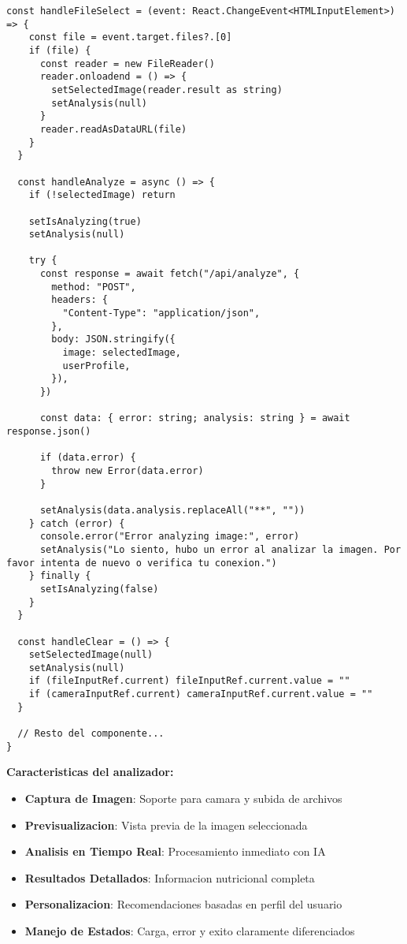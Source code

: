 \documentclass[12pt,a4paper]{article}
\begin{document}
\begin{lstlisting}[caption=components/meals/image-analyzer.tsx - Estructura principal]
  const handleFileSelect = (event: React.ChangeEvent<HTMLInputElement>) => {
    const file = event.target.files?.[0]
    if (file) {
      const reader = new FileReader()
      reader.onloadend = () => {
        setSelectedImage(reader.result as string)
        setAnalysis(null)
      }
      reader.readAsDataURL(file)
    }
  }

  const handleAnalyze = async () => {
    if (!selectedImage) return

    setIsAnalyzing(true)
    setAnalysis(null)

    try {
      const response = await fetch("/api/analyze", {
        method: "POST",
        headers: {
          "Content-Type": "application/json",
        },
        body: JSON.stringify({
          image: selectedImage,
          userProfile,
        }),
      })

      const data: { error: string; analysis: string } = await response.json()

      if (data.error) {
        throw new Error(data.error)
      }

      setAnalysis(data.analysis.replaceAll("**", ""))
    } catch (error) {
      console.error("Error analyzing image:", error)
      setAnalysis("Lo siento, hubo un error al analizar la imagen. Por favor intenta de nuevo o verifica tu conexion.")
    } finally {
      setIsAnalyzing(false)
    }
  }

  const handleClear = () => {
    setSelectedImage(null)
    setAnalysis(null)
    if (fileInputRef.current) fileInputRef.current.value = ""
    if (cameraInputRef.current) cameraInputRef.current.value = ""
  }

  // Resto del componente...
}
\end{lstlisting}

\textbf{Caracteristicas del analizador:}
\begin{itemize}
    \item \textbf{Captura de Imagen}: Soporte para camara y subida de archivos
    \item \textbf{Previsualizacion}: Vista previa de la imagen seleccionada
    \item \textbf{Analisis en Tiempo Real}: Procesamiento inmediato con IA
    \item \textbf{Resultados Detallados}: Informacion nutricional completa
    \item \textbf{Personalizacion}: Recomendaciones basadas en perfil del usuario
    \item \textbf{Manejo de Estados}: Carga, error y exito claramente diferenciados
\end{itemize}
\end{document}
